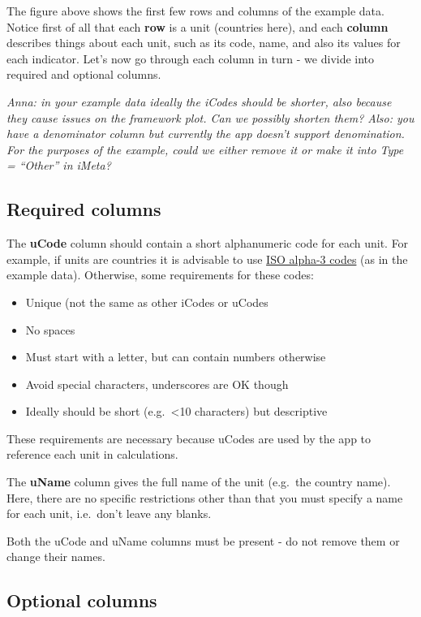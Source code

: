 \documentclass[
  letterpaper,
  DIV=11,
  numbers=noendperiod]{scrreprt}
\providecommand{\tightlist}{%
  \setlength{\itemsep}{0pt}\setlength{\parskip}{0pt}}\usepackage{longtable,booktabs,array}
\begin{document}
The figure above shows the first few rows and columns of the example
data. Notice first of all that each \textbf{row} is a unit (countries
here), and each \textbf{column} describes things about each unit, such
as its code, name, and also its values for each indicator. Let's now go
through each column in turn - we divide into required and optional
columns.

\emph{Anna: in your example data ideally the iCodes should be shorter,
also because they cause issues on the framework plot. Can we possibly
shorten them? Also: you have a denominator column but currently the app
doesn't support denomination. For the purposes of the example, could we
either remove it or make it into Type = ``Other'' in iMeta?}

\hypertarget{required-columns}{%
\subsection{Required columns}\label{required-columns}}

The \textbf{uCode} column should contain a short alphanumeric code for
each unit. For example, if units are countries it is advisable to use
\href{https://en.wikipedia.org/wiki/ISO_3166-1_alpha-3}{ISO alpha-3
codes} (as in the example data). Otherwise, some requirements for these
codes:

\begin{itemize}
\tightlist
\item
  Unique (not the same as other iCodes or uCodes
\item
  No spaces
\item
  Must start with a letter, but can contain numbers otherwise
\item
  Avoid special characters, underscores are OK though
\item
  Ideally should be short (e.g.~\textless10 characters) but descriptive
\end{itemize}

These requirements are necessary because uCodes are used by the app to
reference each unit in calculations.

The \textbf{uName} column gives the full name of the unit (e.g.~the
country name). Here, there are no specific restrictions other than that
you must specify a name for each unit, i.e.~don't leave any blanks.

Both the uCode and uName columns must be present - do not remove them or
change their names.

\hypertarget{optional-columns}{%
\subsection{Optional columns}\label{optional-columns}}
\end{document}
